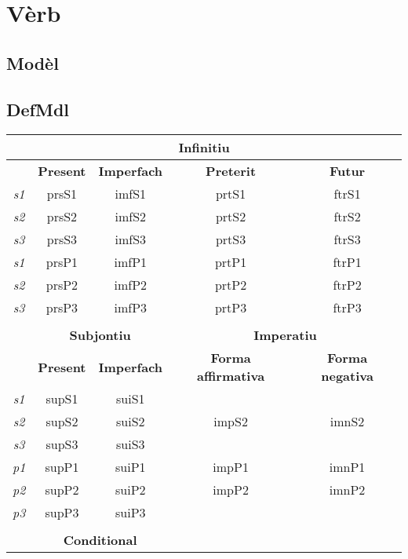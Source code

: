\documentclass[10pt,a4paper,final]{article}
\author{Òsca-Font dubèrta}
\begin{document}
\section*{Vèrb}
\subsection*{Modèl}
\subsection*{DefMdl}

\begin{tabular}{|c|c|c|c|c|}
\hline 
\multicolumn{5}{|c|}{\textbf{Infinitiu}} \\ 
\hline 
 & \textbf{Present} & \textbf{Imperfach} & \textbf{Preterit} & \textbf{Futur} \\ 
\hline 
\textit{s1} & prsS1 & imfS1 & prtS1 & ftrS1 \\ 
\hline 
\textit{s2} & prsS2 & imfS2 & prtS2 & ftrS2 \\ 
\hline 
\textit{s3} & prsS3 & imfS3 & prtS3 & ftrS3 \\ 
\hline 
\textit{s1} & prsP1 & imfP1 & prtP1 & ftrP1 \\ 
\hline 
\textit{s2} & prsP2 & imfP2 & prtP2 & ftrP2 \\ 
\hline 
\textit{s3} & prsP3 & imfP3 & prtP3 & ftrP3 \\ 
\hline 
\multicolumn{5}{|c|}{} \\ 
\hline 
 & \multicolumn{2}{c|}{\textbf{Subjontiu}}  & \multicolumn{2}{c|}{\textbf{Imperatiu}} \\ 
\hline 
 & \textbf{Present} & \textbf{Imperfach} & \textbf{Forma affirmativa} & \textbf{Forma negativa} \\ 
\hline 
\textit{s1} & supS1 & suiS1 & \multicolumn{2}{c|}{} \\ 
\hline 
\textit{s2} & supS2 & suiS2 & impS2 & imnS2 \\ 
\hline 
\textit{s3} & supS3 & suiS3 & \multicolumn{2}{c|}{} \\ 
\hline 
\textit{p1} & supP1 & suiP1 & impP1 & imnP1 \\ 
\hline 
\textit{p2} & supP2 & suiP2 & impP2 & imnP2 \\ 
\hline 
\textit{p3} & supP3 & suiP3 & \multicolumn{2}{c|}{} \\ 
\hline 
\multicolumn{5}{|c|}{} \\ 
\hline 
 & \multicolumn{2}{c|}{\textbf{Conditional}} & \multicolumn{2}{c|}{} \\ 

\end{tabular}
\end{document}
